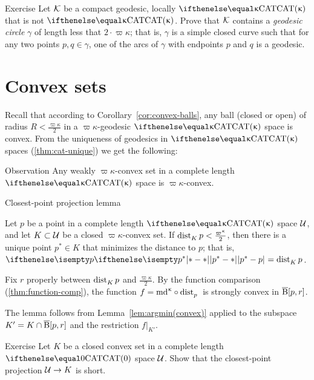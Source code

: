 \begin{thm}{Exercise}\label{ex:geod-circle}
Let $\mathcal{K}$ be a compact geodesic, locally $\CAT\kappa$ that is not $\CAT\kappa$.
Prove that $\mathcal{K}$ contains a \emph{geodesic circle} $\gamma$ of length less that $2\cdot\varpi\kappa$;
that is, $\gamma$ is a simple closed curve such that 
for any two points $p,q\in\gamma$, one of the arcs of $\gamma$ with endpoints $p$ and $q$ is a  geodesic.
\end{thm}

\section{Convex sets}
\label{sec:convex-CBA}

Recall that according to Corollary~\ref{cor:convex-balls}, any ball (closed or open) of radius $R<\tfrac{\varpi\kappa}2$ in a $\varpi\kappa$-geodesic $\CAT\kappa$ space is convex.
From the uniqueness of geodesics in $\CAT\kappa$ spaces (\ref{thm:cat-unique}) we get the following:

\begin{thm}{Observation}
Any weakly $\varpi\kappa$-convex set 
in a complete length $\CAT\kappa$ space is $\varpi\kappa$-convex.
\end{thm}


\begin{thm}{Closest-point projection lemma}\label{lem:closest point}{\sloppy 
Let $p$ be a point in a complete length $\CAT\kappa$ space $\mathcal{U}$, and let $K\subset \spc{U}$ be a closed $\varpi\kappa$-convex set. 
If $\distfun{K}{p}{}<\tfrac{\varpi\kappa}2$,
then there is a unique point $p^*\in K$ that minimizes the distance to $p$;
that is, $\dist{p^*}{p}{}=\distfun{K}{p}{}$. 

}

\end{thm}

Fix $r$ properly between $\mathop{\rm dist}\nolimits_{K}^{{}}{p}{}$ and $\tfrac{\varpi\kappa}2$.
By the function comparison (\ref{thm:function-comp}),
the function $f=\md\kappa\circ\distfun{p}{}{}$ is strongly convex in $\overline{\mathrm{B}}{}[p,r]$.

The lemma follows from Lemma~\ref{lem:argmin(convex)} applied to the subspace $K'\z=K\cap\cBall[p,r]$ 
and the restriction $f|_{K'}$. 
\qeds

\begin{thm}{Exercise}\label{ex:closest-point-projection}
Let $K$ be a closed convex set in a complete length $\CAT0$ space $\mathcal{U}$.
Show that the closest-point projection $\spc{U}\to K$ is short. 
\end{thm}

